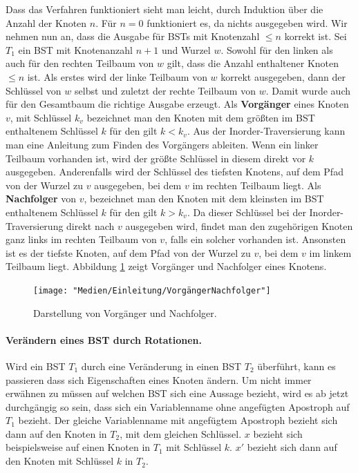 \documentclass[a4paper,12pt]{article}
\begin{document}
\noindent Dass das Verfahren funktioniert sieht man leicht, durch Induktion über die Anzahl der Knoten $n$.
Für $n = 0$ funktioniert es, da nichts ausgegeben wird. Wir nehmen nun an, dass die Ausgabe für BSTs mit Knotenzahl $\leq n$ korrekt ist. Sei $T_1$ ein BST mit Knotenanzahl $n + 1$ und Wurzel $w$. Sowohl für den linken als auch für den rechten Teilbaum von $w$ gilt, dass die Anzahl enthaltener Knoten $\leq n$ ist. Als erstes wird der linke Teilbaum von $w$ korrekt ausgegeben, dann der Schlüssel von $w$ selbst und zuletzt der rechte Teilbaum von $w$. Damit wurde auch für den Gesamtbaum die richtige
Ausgabe erzeugt. 
Als \textbf{Vorgänger} eines Knoten $v$, mit Schlüssel $k_v$ bezeichnet man den Knoten mit dem größten im BST enthaltenem Schlüssel $k$ für den gilt $k < k_v$. Aus der Inorder-Traversierung kann man eine Anleitung zum Finden des Vorgängers ableiten. Wenn ein linker Teilbaum vorhanden ist, wird der größte Schlüssel in diesem direkt vor $k$ ausgegeben. Anderenfalls wird der Schlüssel des tiefsten Knotens, auf dem Pfad von der Wurzel zu $v$ ausgegeben, bei dem $v$ im rechten Teilbaum liegt. Als \textbf{Nachfolger} von $v$, bezeichnet man den Knoten mit dem kleinsten im BST enthaltenem Schlüssel $k$ für den gilt $k > k_v$.
Da dieser Schlüssel bei der Inorder-Traversierung direkt nach $v$ ausgegeben wird, findet man den zugehörigen Knoten ganz links im rechten Teilbaum von $v$, falls ein solcher vorhanden ist. Ansonsten ist es der tiefste Knoten, auf dem Pfad von der Wurzel zu $v$, bei dem $v$ im linkem Teilbaum liegt. Abbildung \ref{fig:VorgängerNachfolger} zeigt Vorgänger und Nachfolger eines Knotens.

\begin{figure}[h]
	\centering
	\texttt{[image: "Medien/Einleitung/VorgängerNachfolger"]}
	\caption{Darstellung von Vorgänger und Nachfolger. }
	\label{fig:VorgängerNachfolger}
\end{figure}

\paragraph{Verändern eines BST durch Rotationen.}
Wird ein BST $T_1$ durch eine Veränderung in einen BST $T_2$ überführt, kann es passieren dass sich Eigenschaften eines Knoten ändern. Um nicht immer erwähnen zu müssen auf welchen BST sich eine Aussage bezieht, wird es ab jetzt durchgängig so sein, dass sich ein Variablenname ohne angefügten Apostroph auf $T_1$ bezieht. Der gleiche Variablenname mit angefügtem Apostroph bezieht sich dann auf den Knoten in $T_2$, mit dem gleichen Schlüssel. $x$ bezieht sich beispielsweise auf einen Knoten in $T_1$ mit Schlüssel $k$. $x'$ bezieht sich dann auf den Knoten mit Schlüssel $k$ in $T_2$. \\
\end{document}
